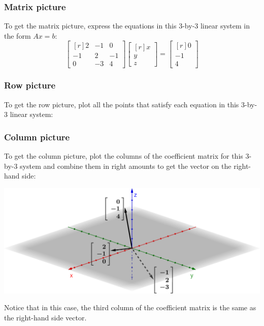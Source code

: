 \documentclass[../main.tex]{subfiles}
\begin{document}
\subsubsection{Matrix picture}
To get the matrix picture, express the equations in this 3-by-3 linear system in the form $Ax = b$:
\[
    \begin{bmatrix*}[r]
        2 & -1 & 0 \\
        -1 & 2 & -1 \\
        0 & -3 & 4
    \end{bmatrix*}
    \begin{bmatrix*}[r]
        x \\
        y \\
        z
    \end{bmatrix*}
    =
    \begin{bmatrix*}[r]
        0 \\
        -1 \\
        4
    \end{bmatrix*}
\]

\subsubsection{Row picture}
To get the row picture, plot all the points that satisfy each equation in this 3-by-3 linear system:

\begingroup
\centering
\par
\endgroup

\subsubsection{Column picture}
To get the column picture, plot the columns of the coefficient matrix for this 3-by-3 system and combine them in right amounts to get the vector on the right-hand side:

\begingroup
\centering
\includegraphics[width = \columnwidth]{../figures/fig04_3d-col-pic/geogebra-derived}
\par
\endgroup
Notice that in this case, the third column of the coefficient matrix is the same as the right-hand side vector.
\end{document}
